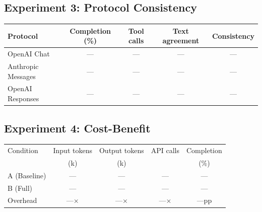 \subsection{Experiment 3: Protocol Consistency}

\begin{center}
\begin{tabular}{lcccc}
\toprule
Protocol & Completion (\%) & Tool calls & Text agreement & Consistency \\
\midrule
OpenAI Chat & --- & --- & --- & --- \\
Anthropic Messages & --- & --- & --- & --- \\
OpenAI Responses & --- & --- & --- & --- \\
\bottomrule
\end{tabular}
\end{center}

\subsection{Experiment 4: Cost-Benefit}

\begin{center}
\begin{tabular}{lcccc}
\toprule
Condition & Input tokens & Output tokens & API calls & Completion \\
 & (k) & (k) & & (\%) \\
\midrule
A (Baseline) & --- & --- & --- & --- \\
B (Full) & --- & --- & --- & --- \\
Overhead & ---$\times$ & ---$\times$ & ---$\times$ & ---pp \\
\bottomrule
\end{tabular}
\end{center}
